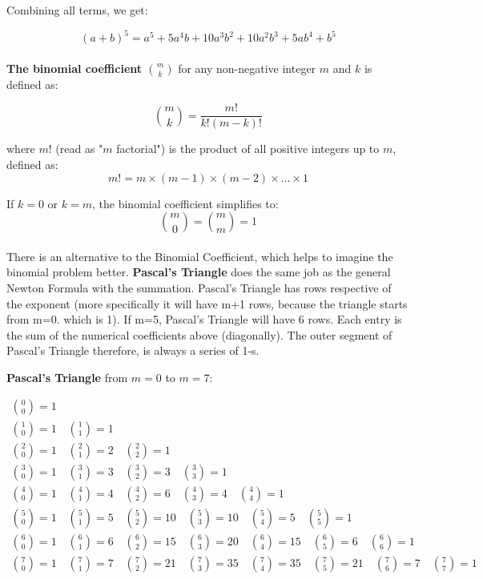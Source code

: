 \documentclass{article}
\begin{document}
Combining all terms, we get:

\begin{equation*}
(a + b)^5 = a^5 + 5a^4b + 10a^3b^2 + 10a^2b^3 + 5ab^4 + b^5
\end{equation*} \\

\textbf{The binomial coefficient \(\binom{m}{k}\)} for any non-negative integer \(m\) and \(k\) is defined as:

\begin{equation}
\binom{m}{k} = \frac{m!}{k!(m - k)!}
\end{equation}

where \(m!\) (read as "\(m\) factorial") is the product of all positive integers up to \(m\), defined as:
\begin{equation}
m! = m \times (m - 1) \times (m - 2) \times \dots \times 1
\end{equation}

If \(k = 0\) or \(k = m\), the binomial coefficient simplifies to:
\begin{equation}
\binom{m}{0} = \binom{m}{m} = 1
\end{equation} \\

There is an alternative to the Binomial Coefficient, which helps to imagine the binomial problem better. \textbf{Pascal's Triangle} does the same job as the general Newton Formula with the summation. Pascal's Triangle has rows respective of the exponent (more specifically it will have m+1 rows, because the triangle starts from m=0. which is 1). If m=5, Pascal's Triangle will have 6 rows. Each entry is the sum of the numerical coefficients above (diagonally). The outer segment of Pascal's Triangle therefore, is always a series of 1-s.  

\textbf{Pascal's Triangle} from \(m = 0\) to \(m = 7\):

\[
\begin{array}{c}
\binom{0}{0} = 1 \\[8pt]
\binom{1}{0} = 1 \quad \binom{1}{1} = 1 \\[8pt]
\binom{2}{0} = 1 \quad \binom{2}{1} = 2 \quad \binom{2}{2} = 1 \\[8pt]
\binom{3}{0} = 1 \quad \binom{3}{1} = 3 \quad \binom{3}{2} = 3 \quad \binom{3}{3} = 1 \\[8pt]
\binom{4}{0} = 1 \quad \binom{4}{1} = 4 \quad \binom{4}{2} = 6 \quad \binom{4}{3} = 4 \quad \binom{4}{4} = 1 \\[8pt]
\binom{5}{0} = 1 \quad \binom{5}{1} = 5 \quad \binom{5}{2} = 10 \quad \binom{5}{3} = 10 \quad \binom{5}{4} = 5 \quad \binom{5}{5} = 1 \\[8pt]
\binom{6}{0} = 1 \quad \binom{6}{1} = 6 \quad \binom{6}{2} = 15 \quad \binom{6}{3} = 20 \quad \binom{6}{4} = 15 \quad \binom{6}{5} = 6 \quad \binom{6}{6} = 1 \\[8pt]
\binom{7}{0} = 1 \quad \binom{7}{1} = 7 \quad \binom{7}{2} = 21 \quad \binom{7}{3} = 35 \quad \binom{7}{4} = 35 \quad \binom{7}{5} = 21 \quad \binom{7}{6} = 7 \quad \binom{7}{7} = 1
\end{array}
\] \\
\end{document}
